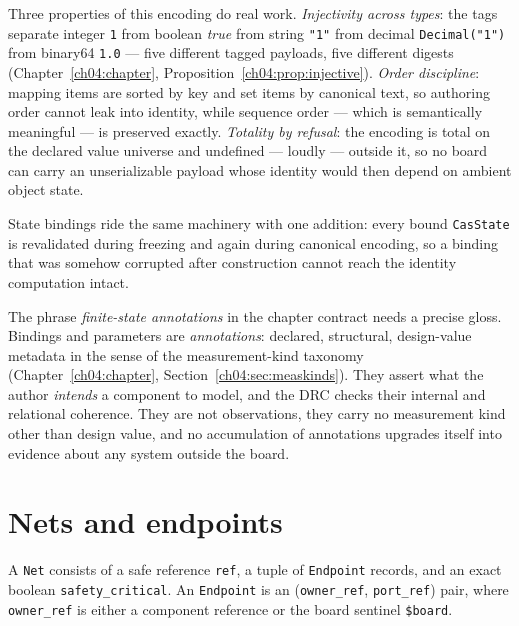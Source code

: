 Three properties of this encoding do real work. \emph{Injectivity across
types}: the tags separate integer \texttt{1} from boolean \emph{true}
from string \texttt{"1"} from decimal \texttt{Decimal("1")} from binary64
\texttt{1.0} --- five different tagged payloads, five different digests
(Chapter~\ref{ch04:chapter},
Proposition~\ref{ch04:prop:injective}). \emph{Order discipline}: mapping
items are sorted by key and set items by canonical text, so authoring
order cannot leak into identity, while sequence order --- which is
semantically meaningful --- is preserved exactly. \emph{Totality by
refusal}: the encoding is total on the declared value universe and
undefined --- loudly --- outside it, so no board can carry an
unserializable payload whose identity would then depend on ambient
object state.

State bindings ride the same machinery with one addition: every bound
\texttt{CasState} is revalidated during freezing and again during
canonical encoding, so a binding that was somehow corrupted after
construction cannot reach the identity computation intact.

The phrase \emph{finite-state annotations} in the chapter contract
needs a precise gloss. Bindings and parameters are
\emph{annotations}: declared, structural, design-value metadata in the
sense of the measurement-kind taxonomy
(Chapter~\ref{ch04:chapter}, Section~\ref{ch04:sec:measkinds}). They
assert what the author \emph{intends} a component to model, and the DRC
checks their internal and relational coherence. They are not
observations, they carry no measurement kind other than design value,
and no accumulation of annotations upgrades itself into evidence about
any system outside the board.

\section{Nets and endpoints}\label{ch05:sec:nets}

\begin{definition}[Net]\label{ch05:def:net}
A \texttt{Net} consists of a safe reference \texttt{ref}, a tuple of
\texttt{Endpoint} records, and an exact boolean
\texttt{safety\_critical}. An \texttt{Endpoint} is an
(\texttt{owner\_ref}, \texttt{port\_ref}) pair, where
\texttt{owner\_ref} is either a component reference or the board
sentinel \texttt{\$board}.
\end{definition}

